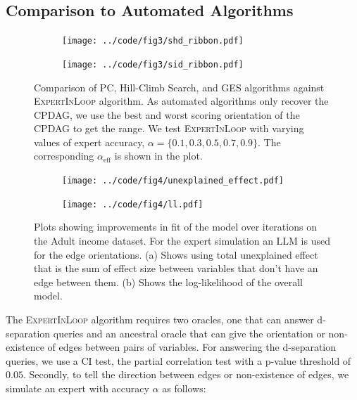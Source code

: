 \documentclass{uai2025} %
\begin{document}
\subsection{Comparison to Automated Algorithms}
\begin{figure}[t!]
	\centering
	\begin{subfigure}{0.5\textwidth}
		\centering
		\texttt{[image: ../code/fig3/shd\_ribbon.pdf]}
		\caption{}
	\end{subfigure}
	\begin{subfigure}{0.5\textwidth}
		\centering
		\texttt{[image: ../code/fig3/sid\_ribbon.pdf]}
		\caption{}
	\end{subfigure}
	\caption{Comparison of PC, Hill-Climb Search, and GES algorithms against
		\textsc{ExpertInLoop} algorithm. As automated algorithms only
		recover the CPDAG, we use the best and worst scoring
		orientation of the CPDAG to get the range. We test
		\textsc{ExpertInLoop} with varying values of expert accuracy, $ \alpha = \{0.1, 0.3, 0.5, 0.7, 0.9\} $. The corresponding
		$\alpha_{\textrm{eff}} $ is shown in the plot.}
	\label{fig:shd_sid}
\end{figure}

\begin{figure}[t!]
	\begin{subfigure}{0.25\textwidth}
		\centering
		\texttt{[image: ../code/fig4/unexplained\_effect.pdf]}
		\caption{}
	\end{subfigure}%
	\begin{subfigure}{0.25\textwidth}
		\centering
		\texttt{[image: ../code/fig4/ll.pdf]}
		\caption{}
	\end{subfigure}
	\caption{Plots showing improvements in fit of the model over iterations
	on the Adult income dataset. For the expert simulation an LLM is used
	for the edge orientations. (a) Shows using total unexplained effect that is the
	sum of effect size between variables that don't have an edge between them. (b)
	Shows the log-likelihood of the overall model.
	}
	\label{fig:unexplained_ll}
\end{figure}

The \textsc{ExpertInLoop} algorithm requires two oracles, one that can answer
d-separation queries and an ancestral oracle that can give the orientation or
non-existence of edges between pairs of variables. For answering the
d-separation queries, we use a CI test, the partial correlation test with a
p-value threshold of $ 0.05 $. Secondly, to tell the direction between edges or
non-existence of edges, we simulate an expert with accuracy $ \alpha $ as
follows:
\end{document}
